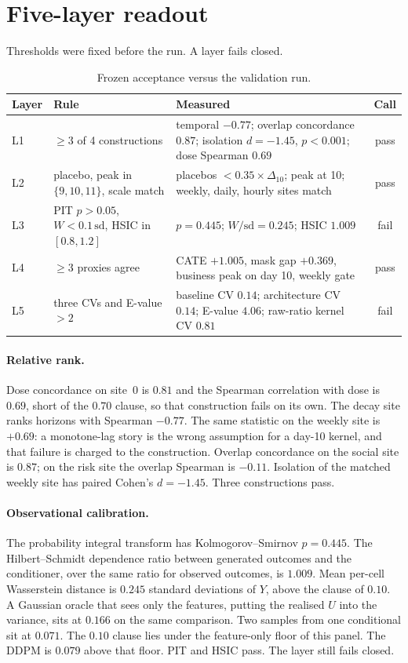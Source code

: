 \documentclass[11pt]{article}
\begin{document}
\section{Five-layer readout}
\label{sec:protocol}

Thresholds were fixed before the run.
A layer fails closed.

\begin{table}[t]
\centering
\caption{Frozen acceptance versus the validation run.}
\label{tab:layers}
\begin{tabular}{@{}llp{6.6cm}c@{}}
\toprule
Layer & Rule & Measured & Call \\
\midrule
L1 & $\ge 3$ of 4 constructions & temporal $-0.77$; overlap concordance $0.87$; isolation $d=-1.45$, $p<0.001$; dose Spearman $0.69$ & pass \\
L2 & placebo, peak in $\{9,10,11\}$, scale match & placebos $<0.35\times\Delta_{10}$; peak at 10; weekly, daily, hourly sites match & pass \\
L3 & PIT $p>0.05$, $W<0.1\,\mathrm{sd}$, HSIC in $[0.8,1.2]$ & $p=0.445$; $W/\mathrm{sd}=0.245$; HSIC $1.009$ & fail \\
L4 & $\ge 3$ proxies agree & CATE $+1.005$, mask gap $+0.369$, business peak on day 10, weekly gate & pass \\
L5 & three CVs and E-value $>2$ & baseline CV $0.14$; architecture CV $0.14$; E-value $4.06$; raw-ratio kernel CV $0.81$ & fail \\
\bottomrule
\end{tabular}
\end{table}

\paragraph{Relative rank.}
Dose concordance on site~0 is $0.81$ and the Spearman correlation with dose is $0.69$, short of the $0.70$ clause, so that construction fails on its own.
The decay site ranks horizons with Spearman $-0.77$.
The same statistic on the weekly site is $+0.69$: a monotone-lag story is the wrong assumption for a day-10 kernel, and that failure is charged to the construction.
Overlap concordance on the social site is $0.87$; on the risk site the overlap Spearman is $-0.11$.
Isolation of the matched weekly site has paired Cohen's $d=-1.45$.
Three constructions pass.

\paragraph{Observational calibration.}
The probability integral transform \citep{dawid1984present} has Kolmogorov--Smirnov $p=0.445$.
The Hilbert--Schmidt dependence ratio \citep{gretton2005measuring} between generated outcomes and the conditioner, over the same ratio for observed outcomes, is $1.009$.
Mean per-cell Wasserstein distance is $0.245$ standard deviations of $Y$, above the clause of $0.10$.
A Gaussian oracle that sees only the features, putting the realised $U$ into the variance, sits at $0.166$ on the same comparison.
Two samples from one conditional sit at $0.071$.
The $0.10$ clause lies under the feature-only floor of this panel.
The DDPM is $0.079$ above that floor.
PIT and HSIC pass.
The layer still fails closed.
\end{document}
